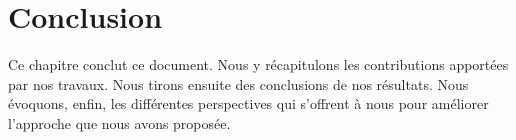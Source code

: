 
\chapter{\label{section:conclusion}Conclusion}




Ce chapitre conclut ce document.
Nous y récapitulons les contributions apportées par nos travaux.
Nous tirons ensuite des conclusions de nos résultats.
Nous évoquons, enfin, les différentes perspectives qui s'offrent à nous pour améliorer l'approche que nous avons proposée.

